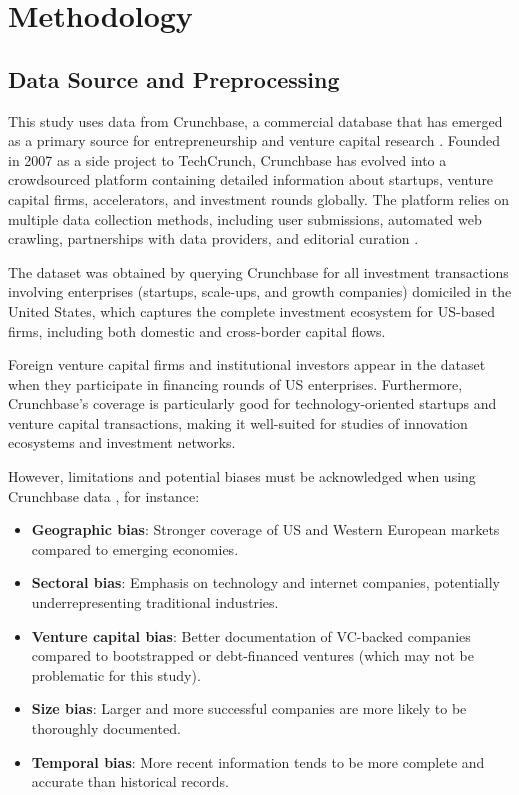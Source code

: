 \section{Methodology}

\subsection{Data Source and Preprocessing}

This study uses data from Crunchbase, a commercial database that has emerged as a primary source for entrepreneurship and venture capital research \cite{OECD2017}. Founded in 2007 as a side project to TechCrunch, Crunchbase has evolved into a crowdsourced platform containing detailed information about startups, venture capital firms, accelerators, and investment rounds globally. The platform relies on multiple data collection methods, including user submissions, automated web crawling, partnerships with data providers, and editorial curation \cite{OECD2017}.

The dataset was obtained by querying Crunchbase for all investment transactions involving enterprises (startups, scale-ups, and growth companies) domiciled in the United States, which captures the complete investment ecosystem for US-based firms, including both domestic and cross-border capital flows. 

Foreign venture capital firms and institutional investors appear in the dataset when they participate in financing rounds of US enterprises. Furthermore, Crunchbase's coverage is particularly good for technology-oriented startups and venture capital transactions, making it well-suited for studies of innovation ecosystems and investment networks.

However, limitations and potential biases must be acknowledged when using Crunchbase data \cite{OECD2017}, for instance:

\begin{itemize}
    \item \textbf{Geographic bias}: Stronger coverage of US and Western European markets compared to emerging economies.
    \item \textbf{Sectoral bias}: Emphasis on technology and internet companies, potentially underrepresenting traditional industries.
    \item \textbf{Venture capital bias}: Better documentation of VC-backed companies compared to bootstrapped or debt-financed ventures (which may not be problematic for this study).
    \item \textbf{Size bias}: Larger and more successful companies are more likely to be thoroughly documented.
    \item \textbf{Temporal bias}: More recent information tends to be more complete and accurate than historical records.
\end{itemize}

